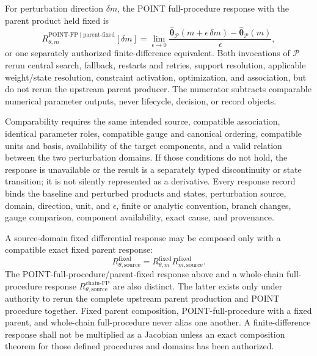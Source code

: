 For perturbation direction $\delta m$, the POINT full-procedure response with
the parent product held fixed is
\begin{equation}
R^{\mathrm{POINT\mbox{-}FP}\mid\mathrm{parent\mbox{-}fixed}}_{\theta,m}
[\delta m]
=\lim_{\epsilon\rightarrow0}
\frac{\widehat{\boldsymbol{\theta}}_{\mathcal P}
(m+\epsilon\,\delta m)-
\widehat{\boldsymbol{\theta}}_{\mathcal P}(m)}{\epsilon},
\label{eq:full-procedure-response}
\end{equation}
or one separately authorized finite-difference equivalent. Both invocations
of $\mathcal{P}$ rerun central search, fallback, restarts and retries, support
resolution, applicable weight/state resolution, constraint activation,
optimization, and association, but do not rerun the upstream parent producer.
The numerator subtracts comparable numerical parameter outputs, never
lifecycle, decision, or record objects.

Comparability requires the same intended source, compatible association,
identical parameter roles, compatible gauge and canonical ordering, compatible
units and basis, availability of the target components, and a valid relation
between the two perturbation domains. If those conditions do not hold, the
response is unavailable or the result is a separately typed discontinuity or
state transition; it is not silently represented as a derivative. Every
response record binds the baseline and perturbed products and states,
perturbation source, domain, direction, unit, and $\epsilon$, finite or analytic
convention, branch changes, gauge comparison, component availability, exact
cause, and provenance.

A source-domain fixed differential response may be composed only with a
compatible exact fixed parent response:
\begin{equation}
R^{\mathrm{fixed}}_{\theta,\mathrm{source}}
=R^{\mathrm{fixed}}_{\theta,m}
 R^{\mathrm{fixed}}_{m,\mathrm{source}}.
\label{eq:source-response}
\end{equation}
The POINT-full-procedure/parent-fixed response above and a whole-chain
full-procedure response
$R^{\mathrm{chain\mbox{-}FP}}_{\theta,\mathrm{source}}$ are also distinct.
The latter exists only under authority to rerun the complete upstream parent
production and POINT procedure together. Fixed parent composition,
POINT-full-procedure with a fixed parent, and whole-chain full-procedure never
alias one another. A finite-difference response shall not be multiplied as a
Jacobian unless an exact composition theorem for those defined procedures and
domains has been authorized.

